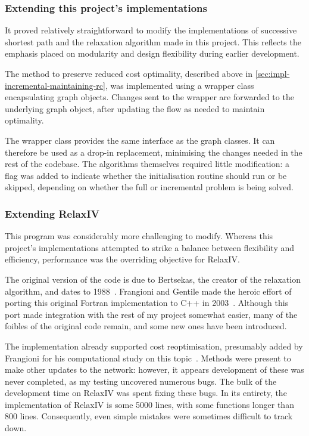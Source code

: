 \subsubsection{Extending this project's implementations}
It proved relatively straightforward to modify the implementations of successive shortest path and the relaxation algorithm made in this project. This reflects the emphasis placed on modularity and design flexibility during earlier development.

The method to preserve reduced cost optimality, described above in \cref{sec:impl-incremental-maintaining-rc}, was implemented using a wrapper class encapsulating graph objects. Changes sent to the wrapper are forwarded to the underlying graph object, after updating the flow as needed to maintain optimality. 

The wrapper class provides the same interface as the graph classes. It can therefore be used as a drop-in replacement, minimising the changes needed in the rest of the codebase. The algorithms themselves required little modification: a flag was added to indicate whether the initialisation routine should run or be skipped, depending on whether the full or incremental problem is being solved.
 
\subsubsection{Extending RelaxIV}
This program was considerably more challenging to modify. Whereas this project's implementations attempted to strike a balance between flexibility and efficiency, performance was the overriding objective for RelaxIV.

The original version of the code is due to Bertsekas, the creator of the relaxation algorithm, and dates to 1988~\cite{BertsekasCodes:1988}. Frangioni and Gentile made the heroic effort of porting this original Fortran implementation to C++ in 2003~\cite{RelaxIV:2011}. Although this port made integration with the rest of my project somewhat easier, many of the foibles of the original code remain, and some new ones have been introduced.

The implementation already supported cost reoptimisation, presumably added by Frangioni for his computational study on this topic~\cite{Frangioni:2006}. Methods were present to make other updates to the network: however, it appears development of these was never completed, as my testing uncovered numerous bugs. The bulk of the development time on RelaxIV was spent fixing these bugs. In its entirety, the implementation of RelaxIV is some 5000 lines, with some functions longer than 800 lines. Consequently, even simple mistakes were sometimes difficult to track down\footnotemark.

